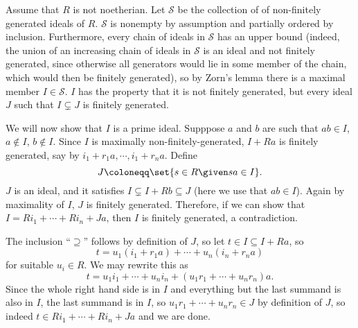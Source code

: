 Assume that $R$ is not noetherian. Let $\mathcal{S}$ be the collection of
of non-finitely generated ideals of $R$. $\mathcal{S}$ is nonempty by assumption
and partially ordered by inclusion. Furthermore, every chain of ideals in $\mathcal{S}$
has an upper bound (indeed, the union of an increasing chain of ideals in $\mathcal{S}$
is an ideal and not finitely generated, since otherwise all generators would lie in
some member of the chain, which would then be finitely generated), so by Zorn's lemma
there is a maximal member $I \in \mathcal{S}$. $I$ has the property that it is not
finitely generated, but every ideal $J$ such that $I \subsetneq J$ is finitely
generated.

We will now show that $I$ is a prime ideal. Supppose $a$ and $b$ are such that
$ab \in I$, $a \notin I$, $b \notin I$. Since $I$ is maximally non-finitely-generated,
$I+Ra$ is finitely generated, say by $i_1 + r_1a, \cdots, i_1+r_na$. Define
\[ J \coloneqq \set{s \in R\given sa \in I}. \]
$J$ is an ideal, and it satisfies $I \subsetneq I+Rb \subseteq J$ (here we use
that $ab \in I$). Again by maximality of $I$, $J$ is finitely generated.
Therefore, if we can show that $I = Ri_1 + \cdots + Ri_n + Ja$, then $I$ is finitely
generated, a contradiction.

The inclusion \enquote{$\supseteq$} follows by definition of $J$, so let
$t \in I \subseteq I + Ra$, so \[ t = u_1(i_1 + r_1a) + \cdots + u_n(i_n + r_na) \]
for suitable $u_i \in R$. We may rewrite this as
\[ t = u_1i_1 + \cdots + u_ni_n + (u_1r_1 + \cdots + u_nr_n)a. \]
Since the whole right hand side is in $I$ and everything but the last summand
is also in $I$, the last summand is in $I$, so $u_1r_1 + \cdots + u_nr_n \in J$
by definition of $J$, so indeed $t \in Ri_1 + \cdots + Ri_n + Ja$ and we are done.
